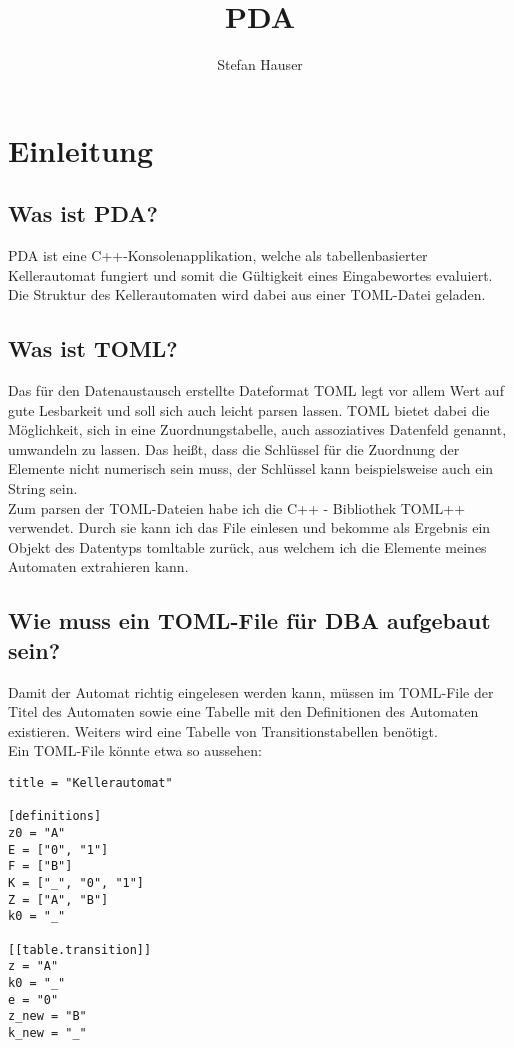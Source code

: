 \documentclass[12pt,a4paper]{article}
\begin{document}
\begin{titlepage}
\centering
\title{PDA}
\author{Stefan Hauser}
\vfill
\end{titlepage}
\maketitle
\newpage
\tableofcontents
\newpage

\section{Einleitung}
\subsection{Was ist PDA?}
PDA ist eine C++-Konsolenapplikation, welche als tabellenbasierter Kellerautomat fungiert und somit die Gültigkeit eines Eingabewortes evaluiert. Die Struktur des Kellerautomaten wird dabei aus einer TOML-Datei geladen.
\subsection{Was ist TOML?}
Das für den Datenaustausch erstellte Dateformat TOML legt vor allem Wert auf gute Lesbarkeit und soll sich auch leicht parsen lassen. TOML bietet dabei die Möglichkeit, sich in eine Zuordnungstabelle, auch assoziatives Datenfeld genannt, umwandeln zu lassen. Das heißt, dass die Schlüssel für die Zuordnung der Elemente nicht numerisch sein muss, der Schlüssel kann beispielsweise auch ein String sein.
\\
\medskip
Zum parsen der TOML-Dateien habe ich die C++ - Bibliothek TOML++ verwendet. Durch sie kann ich das File einlesen und bekomme als Ergebnis ein Objekt des Datentyps tomltable zurück, aus welchem ich die Elemente meines Automaten extrahieren kann.

\subsection{Wie muss ein TOML-File für DBA aufgebaut sein?}
Damit der Automat richtig eingelesen werden kann, müssen im TOML-File der Titel des Automaten sowie eine Tabelle mit den Definitionen des Automaten existieren. Weiters wird eine Tabelle von Transitionstabellen benötigt. 
\\
Ein TOML-File könnte etwa so aussehen:
\begin{lstlisting}
title = "Kellerautomat"

[definitions]
z0 = "A"             
E = ["0", "1"]       
F = ["B"]            
K = ["_", "0", "1"]  
Z = ["A", "B"]       
k0 = "_"             

[[table.transition]]
z = "A"
k0 = "_"
e = "0"
z_new = "B"
k_new = "_"
\end{lstlisting}
\end{document}
